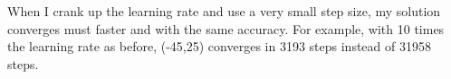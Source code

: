 \documentclass[titlepage]{tufte-book}
\begin{document}
\begin{fullwidth}
\noindent {}

\noindent {}

When I crank up the learning rate and use a very small step size, my solution converges must faster and with the same accuracy. For example, with 10 times the learning rate as before, (-45,25) converges in 3193 steps instead of 31958 steps.


\end{fullwidth}
\end{document}
